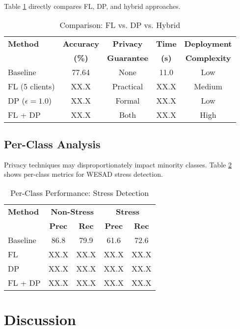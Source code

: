 \documentclass[conference]{IEEEtran}
\begin{document}
Table \ref{tab:comparison} directly compares FL, DP, and hybrid approaches.

\begin{table}[htbp]
\centering
\caption{Comparison: FL vs. DP vs. Hybrid}
\label{tab:comparison}
\begin{tabular}{@{}lcccc@{}}
\toprule
\textbf{Method} & \textbf{Accuracy} & \textbf{Privacy} & \textbf{Time} & \textbf{Deployment} \\
 & \textbf{(\%)} & \textbf{Guarantee} & \textbf{(s)} & \textbf{Complexity} \\ \midrule
Baseline   & 77.64 & None & 11.0 & Low \\
FL (5 clients) & XX.X & Practical & XX.X & Medium \\
DP ($\epsilon=1.0$) & XX.X & Formal & XX.X & Low \\
FL + DP & XX.X & Both & XX.X & High \\ \bottomrule
\end{tabular}
\end{table}

\subsection{Per-Class Analysis}

Privacy techniques may disproportionately impact minority classes. Table \ref{tab:per_class} shows per-class metrics for WESAD stress detection.

\begin{table}[htbp]
\centering
\caption{Per-Class Performance: Stress Detection}
\label{tab:per_class}
\begin{tabular}{@{}lcccc@{}}
\toprule
\textbf{Method} & \multicolumn{2}{c}{\textbf{Non-Stress}} & \multicolumn{2}{c}{\textbf{Stress}} \\
 & \textbf{Prec} & \textbf{Rec} & \textbf{Prec} & \textbf{Rec} \\ \midrule
Baseline & 86.8 & 79.9 & 61.6 & 72.6 \\
FL       & XX.X & XX.X & XX.X & XX.X \\
DP       & XX.X & XX.X & XX.X & XX.X \\
FL + DP  & XX.X & XX.X & XX.X & XX.X \\ \bottomrule
\end{tabular}
\end{table}

\section{Discussion}
\label{sec:discussion}
\end{document}
